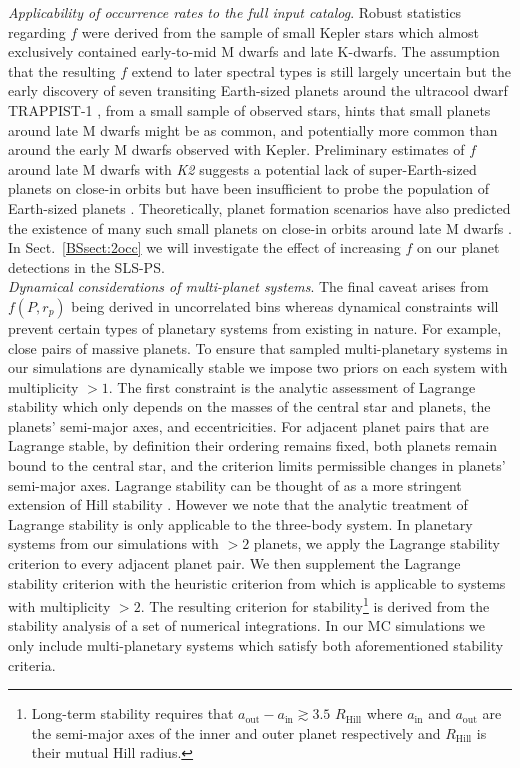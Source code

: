 \emph{Applicability of occurrence rates to the full input catalog}.
Robust statistics regarding $f$ were derived from the 
sample of small Kepler stars which almost exclusively contained early-to-mid M dwarfs and late K-dwarfs.
The assumption that the resulting $f$ extend to later spectral
types is still largely uncertain but the early discovery of seven transiting Earth-sized planets around the
ultracool dwarf TRAPPIST-1 \citep{gillon17}, from a small sample of observed stars, hints that small planets
around late M dwarfs might be as common, and potentially more common than around the early M dwarfs observed
with Kepler. Preliminary estimates of $f$ around
late M dwarfs with \emph{K2} suggests a potential lack of super-Earth-sized planets on close-in orbits but have
been insufficient to probe the population of Earth-sized planets \citep{demory16}. Theoretically,
planet formation scenarios have also predicted the existence of many such small planets on close-in orbits
around late M dwarfs \citep[e.g.][]{alibert13,alibert17}. In Sect.~\ref{BSsect:2occ} we will investigate the
effect of increasing $f$ on our planet detections in the SLS-PS. \\

\emph{Dynamical considerations of multi-planet systems}.
The final caveat arises from $f(P,r_p)$ being derived in uncorrelated bins whereas dynamical constraints 
will prevent certain types of planetary systems from existing in nature. For example, close pairs
of massive planets. To ensure that sampled multi-planetary systems in our simulations are dynamically stable
we impose two priors on each system with multiplicity $> 1$.
The first constraint is the analytic assessment of Lagrange
stability \citep{barnes06} which only depends on the masses of the central star and planets, the planets'
semi-major axes, and eccentricities. For adjacent planet pairs that are Lagrange stable, by definition
their ordering remains fixed, both planets remain bound to the central star, and the criterion limits 
permissible changes in planets’ semi-major axes. Lagrange stability can be thought of as a more stringent
extension of Hill stability \citep{gladman93}. However we
note that the analytic treatment of Lagrange stability is only applicable to the three-body system.
In planetary systems from our simulations with $>2$ planets, we apply the Lagrange stability criterion
to every adjacent planet pair. We then supplement the Lagrange stability
criterion with the heuristic criterion from \cite{fabrycky12} which is applicable to systems with multiplicity
$>2$. The resulting criterion for stability\footnote{Long-term stability requires that
  $a_{\text{out}} - a_{\text{in}} \gtrsim 3.5$ $R_{\text{Hill}}$ where $a_{\text{in}}$ and $a_{\text{out}}$ are the
  semi-major axes of the inner and outer planet respectively and $R_{\text{Hill}}$ is their mutual Hill radius.}
is derived from the stability analysis of a set of numerical integrations. In our MC simulations
we only include multi-planetary systems which satisfy both aforementioned stability criteria. \\

